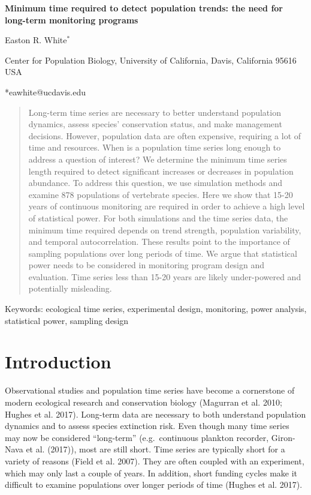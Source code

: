 \documentclass[12pt,]{article}
\title{}
\author{}
\date{}
\begin{document}
\textbf{Minimum time required to detect population trends: the need for long-term monitoring programs}
\vspace{3 mm}

Easton R. White\(^{*}\)

\begin{footnotesize} Center for Population Biology, University of California, Davis, California 95616 USA

*eawhite@ucdavis.edu
\end{footnotesize}

\vspace{5 mm}

\linenumbers

\begin{abstract}
Long-term time series are necessary to better understand population dynamics, assess species' conservation status, and make management decisions. However, population data are often expensive, requiring a lot of time and resources. When is a population time series long enough to address a question of interest? We determine the minimum time series length required to detect significant increases or decreases in population abundance. To address this question, we use simulation methods and examine 878 populations of vertebrate species. Here we show that 15-20 years of continuous monitoring are required in order to achieve a high level of statistical power. For both simulations and the time series data, the minimum time required depends on trend strength, population variability, and temporal autocorrelation. These results point to the importance of sampling populations over long periods of time. We argue that statistical power needs to be considered in monitoring program design and evaluation. Time series less than 15-20 years are likely under-powered and potentially misleading.
\end{abstract}

Keywords: ecological time series, experimental design, monitoring, power
analysis, statistical power, sampling design

\section{Introduction}\label{introduction}

Observational studies and population time series have become a
cornerstone of modern ecological research and conservation biology
(Magurran et al. 2010; Hughes et al. 2017). Long-term data are necessary
to both understand population dynamics and to assess species extinction
risk. Even though many time series may now be considered ``long-term''
(e.g.~continuous plankton recorder, Giron-Nava et al. (2017)), most are
still short. Time series are typically short for a variety of reasons
(Field et al. 2007). They are often coupled with an experiment, which
may only last a couple of years. In addition, short funding cycles make
it difficult to examine populations over longer periods of time (Hughes
et al. 2017).
\end{document}
